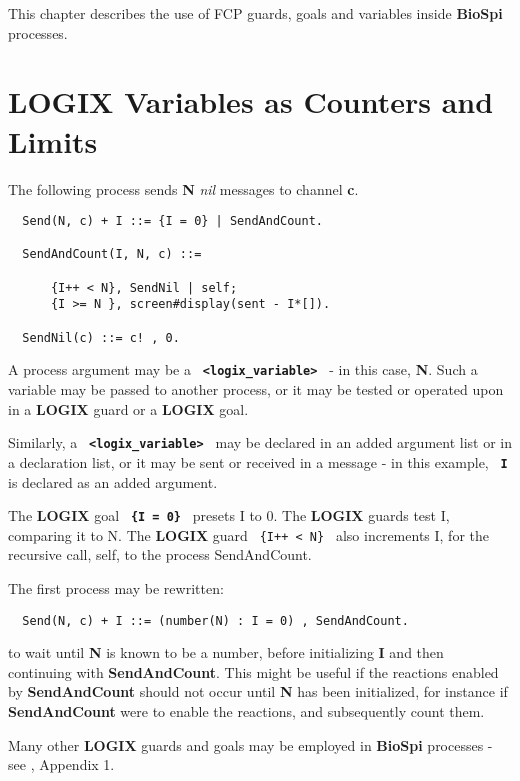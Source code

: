 \documentclass[twoside,10pt]{report}
\begin{document}
This chapter describes the use of FCP guards, goals and
variables inside {\bf BioSpi} processes.

\section{LOGIX Variables as Counters and Limits}
The following process sends {\bf N} {\em nil} messages to channel {\bf c}.

\begin{verbatim}
  Send(N, c) + I ::= {I = 0} | SendAndCount.

  SendAndCount(I, N, c) ::=

      {I++ < N}, SendNil | self;
      {I >= N }, screen#display(sent - I*[]).

  SendNil(c) ::= c! , 0.
\end{verbatim}

\noindent
A process argument may be a {\bf \verb+ <logix_variable> +} - in this case,
{\bf N}.
Such a variable may be passed to another process, or it may be
tested or operated upon in a {\bf LOGIX} guard or a {\bf LOGIX} goal.

\noindent
Similarly, a {\bf \verb+ <logix_variable> +} may be declared in an added
argument list or in a declaration list, or it may be sent or
received in a message - in this example, {\bf \verb+ I +} is declared
as an added argument.

\noindent
The {\bf LOGIX} goal {\bf \verb+ {I = 0} +} presets I to 0.
\noindent
The {\bf LOGIX} guards test I, comparing it to N.
The {\bf LOGIX} guard \verb# {I++ < N} # also increments I, for the
recursive call, self, to the process SendAndCount.

\noindent
The first process may be rewritten:

\begin{verbatim}
  Send(N, c) + I ::= (number(N) : I = 0) , SendAndCount.
\end{verbatim}

\noindent
to wait until {\bf N} is known to be a number, before initializing
{\bf I} and then continuing with {\bf SendAndCount}.  This might be useful
if the reactions enabled by {\bf SendAndCount} should not occur
until {\bf N} has been initialized, for instance if {\bf SendAndCount}
were to enable the reactions, and subsequently count them.
\newline

\noindent
Many other {\bf LOGIX} guards and goals may be employed in {\bf BioSpi}
processes - see \cite{logix:user-man}, Appendix 1.
\end{document}
